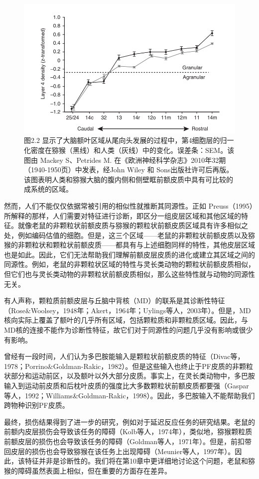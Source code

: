 \begin{figure}[!htb]
	\centering
	\includegraphics[width=0.8\linewidth]{image_pfc/Fig_2_2}
	\caption*{图2.2 显示了大脑额叶区域从尾向头发展的过程中，第4细胞层的归一化密度在猕猴（黑线）和人类（灰线）中的变化。误差条：SEM。该图由 Mackey S、Petrides M. 在《欧洲神经科学杂志》2010年32期（1940-1950页）中发表，经John Wiley 和 Sons出版社许可后再版。该图表明人类和猕猴大脑的腹内侧和侧壁眶前额皮质中具有可比较的成系统的区域。}
\end{figure}

然而，人们不能仅仅依据常被引用的相似性就推断其同源性。正如 Preuss（1995）所解释的那样，人们需要对特征进行诊断，即区分一组皮层区域和其他区域的特征。就像老鼠的非颗粒状前额皮质与猕猴的颗粒状前额皮质区域具有许多相似之处，例如编码估值的细胞。但是，这三个区域——老鼠的非颗粒状前额皮质以及猕猴的非颗粒状和颗粒状前额皮质——都具有与上述细胞同样的特性，其他皮层区域也是如此。因此，它们无法帮助我们理解前额皮层皮质的进化或建立其区域之间的同源性。例如，老鼠的非颗粒状区域的特性与灵长类动物的颗粒状前额皮质相似，但它们也与灵长类动物的非颗粒状前额皮质相似，那么这些特性就与动物的同源性无关。

有人声称，颗粒质前额皮层与丘脑中背核（MD）的联系是其诊断性特征（Rose\&Woolsey，1948年；Akert，1964年；Uylings等人，2003年）。但是，MD核向实际上覆盖了额叶的几乎所有区域，包括颗粒质和非颗粒质区域。因此，与MD核的连接不能作为诊断性特征，故它们对于同源性的问题几乎没有影响或很少有影响。

曾经有一段时间，人们认为多巴胺能输入是颗粒状前额皮质的特征（Divac等，1978；Porrino\&Goldman-Rakic，1982）。但是这些输入也终止于PF皮质的非颗粒状部分和运动前区，以及额叶以外大部分皮质。事实上，在灵长类动物中，多巴胺输入到运动前皮质和后枕叶皮质的强度比大多数颗粒状前额皮质都要强（Gaspar等人，1992；Williams\&Goldman-Rakic，1998）。因此，多巴胺输入不能帮助我们跨物种识别PF皮质。

最终，损伤结果得到了进一步的研究，例如对于延迟反应任务的研究结果。老鼠的前额内皮层损伤会导致该任务的障碍（Kolb等人，1974年），类似地，猕猴颗粒质前额皮层的损伤也会导致该任务的障碍（Goldman等人，1971年）。但是，前扣带回皮层的损伤也会导致猕猴在该任务上出现障碍（Meunier等人，1997年）。因此，该特征并非是诊断性的。我们将在第10章中更详细地讨论这个问题，老鼠和猕猴的障碍虽然表面上相似，但在重要的方面存在差异。

